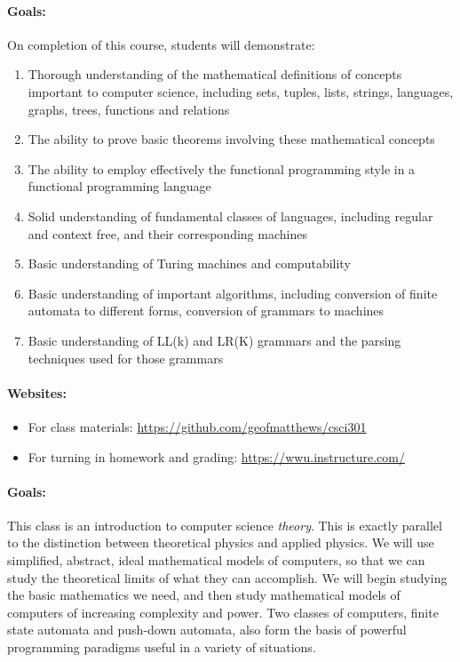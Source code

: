 \documentclass{article}
\begin{document}
\paragraph{Goals:}  On completion of this course, students will demonstrate:
\begin{enumerate}
\item
Thorough understanding of the mathematical definitions of concepts
important to computer science, including sets, tuples, lists, strings,
languages, graphs, trees, functions and relations
\item
The ability to prove basic theorems involving these
mathematical concepts
\item
The ability to employ effectively the functional programming style in a
functional programming language
\item
Solid understanding of fundamental classes of languages, including
regular and context free, and their corresponding machines
\item
Basic understanding of Turing machines and computability
\item
Basic understanding of important algorithms, including conversion of
finite automata to different forms, conversion of grammars to machines
\item
Basic understanding of LL(k) and LR(K) grammars and the parsing
techniques used for those grammars
\end{enumerate}

\paragraph{Websites:}
\begin{itemize}
  \item For class materials: \url{https://github.com/geofmatthews/csci301}
  \item For turning in homework and
    grading: \url{https://wwu.instructure.com/} 
\end{itemize}


\paragraph{Goals:} This class is an introduction to computer science {\em
    theory}.  This is exactly parallel to the distinction between
  theoretical physics and applied physics.  We will use simplified,
  abstract, ideal mathematical models of computers, so that we can
  study the theoretical limits of what they can accomplish.  We will
  begin studying the basic mathematics we need, and then study
  mathematical models of computers of increasing complexity and power.
  Two classes of computers, finite state automata and push-down
  automata, also form the basis of powerful programming paradigms
  useful in a variety of situations.
\end{document}
